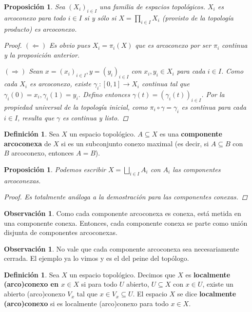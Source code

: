 \documentclass[12pt]{book}
\newtheorem{prop}[teo]{Proposición}
\theoremstyle{definition}
\newtheorem{obs}[teo]{Observación}
\newtheorem{defn}[teo]{Definición}
\begin{document}
\begin{prop}
Sea $(X_i)_{i\in I}$ una familia de espacios topológicos. $X_i$ es arcoconexo para todo $i\in I$ si y sólo si $X=\displaystyle\prod_{i\in I}X_i$ (provisto de la topología producto) es arcoconexo.
\begin{proof}
$(\Longleftarrow)$ Es obvio pues $X_i = \pi_i(X)$ que es arcoconexo por ser $\pi_i$ continua y la proposición anterior.

$(\Longrightarrow)$ Sean $x=(x_i)_{i\in I}, y = (y_i)_{i\in I}$ con $x_i,y_i\in X_i$ para cada $i\in I$. Como cada $X_i$ es arcoconexo, existe $\gamma_i:[0,1]\to X_i$ continua tal que $\gamma_i(0)=x_i, \gamma_i(1)=y_i$. Defino entonces $\gamma(t) = (\gamma_i(t))_{i\in I}$. Por la propiedad universal de la topología inicial, como $\pi_i\circ\gamma = \gamma_i$ es continua para cada $i\in I$, resulta que $\gamma$ es continua y listo.
\end{proof}
\end{prop}

\begin{defn}
Sea $X$ un espacio topológico. $A\subseteq X$ es una \textbf{componente arcoconexa} de $X$ si es un subconjunto conexo maximal (es decir, si $A\subseteq B$ con $B$ arcoconexo, entonces $A=B$).
\end{defn}

\begin{prop}
Podemos escribir $X=\displaystyle\bigsqcup_{i\in I}A_i$ con $A_i$ las componentes arcoconexas.
\begin{proof}
Es totalmente análoga a la demostración para las componentes conexas.
\end{proof}
\end{prop}

\begin{obs}
Como cada componente arcoconexa es conexa, está metida en una componente conexa. Entonces, cada componente conexa se parte como unión disjunta de componentes arcoconexas.
\end{obs}

\begin{obs}
No vale que cada componente arcoconexa sea necesariamente cerrada. El ejemplo ya lo vimos y es el del peine del topólogo.
\end{obs}

\begin{defn}
Sea $X$ un espacio topológico. Decimos que $X$ es \textbf{localmente (arco)conexo en $x\in X$} si para todo $U$ abierto, $U\subseteq X$ con $x\in U$, existe un abierto (arco)conexo $V_x$ tal que $x\in V_x\subseteq U$. El espacio $X$ se dice \textbf{localmente (arco)conexo} si es localmente (arco)conexo para todo $x\in X$.
\end{defn}
\end{document}
